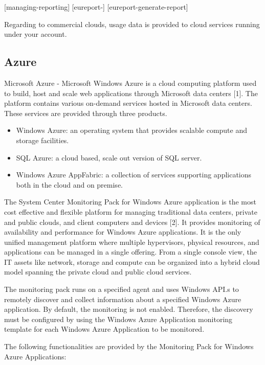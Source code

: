 \documentclass{sig-alternate}
\begin{document}
[managing-reporting] [eureport-] [eureport-generate-report]

Regarding to commercial clouds, usage data is provided to cloud services running under your account.

\subsection{Azure}

Microsoft Azure - Microsoft Windows Azure is a cloud computing platform used to build, host and scale web applications through Microsoft data centers [1]. The platform contains various on-demand services hosted in Microsoft data centers. These services are provided through three products.

\begin{itemize}
 \item Windows Azure: an operating system that provides scalable compute and storage facilities.
 \item SQL Azure: a cloud based, scale out version of SQL server.
 \item Windows Azure AppFabric: a collection of services supporting applications both in the cloud and on premise.
\end{itemize}

The System Center Monitoring Pack for Windows Azure application is the most cost effective and flexible platform for managing traditional data centers, private and public clouds, and client computers and devices [2]. It provides monitoring of availability and performance for Windows Azure applications. It is the only unified management platform where multiple hypervisors, physical resources, and applications can be managed in a single offering. From a single console view, the IT assets like network, storage and compute can be organized into a hybrid cloud model spanning the private cloud and public cloud services.

The monitoring pack runs on a specified agent and uses Windows API.s to remotely discover and collect information about a specified Windows Azure application. By default, the monitoring is not enabled. Therefore, the discovery must be configured by using the Windows Azure Application monitoring template for each Windows Azure Application to be monitored.

The following functionalities are provided by the Monitoring Pack for Windows Azure Applications:
\end{document}
